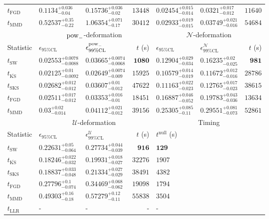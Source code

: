 \begin{tabular}{l|llr|llr}
	$t_{\mathrm{FGD}}$ & ${\mathbf{0.1134_{-0.04}^{+0.036}}}$ & ${\mathbf{0.15736_{-0.02}^{+0.036}}}$ & $13448$ & $0.02454_{-0.014}^{+0.015}$ & $0.0321_{-0.012}^{+0.017}$ & $11640$ \\
	$t_{\mathrm{MMD}}$ & $0.52537_{-0.22}^{+0.35}$ & $1.06354_{-0.17}^{+0.071}$ & $30412$ & $0.02933_{-0.015}^{+0.019}$ & $0.03749_{-0.016}^{+0.021}$ & $54684$ \\
	\toprule
	\multicolumn{1}{c}{} & \multicolumn{3}{c}{$\rm{pow}_{-}$-deformation} & \multicolumn{3}{c}{$\mathcal{N}$-deformation} \\
	Statistic & $\epsilon_{95\%\mathrm{CL}}$ & $\epsilon^  {\rm{pow}_{-}}_{99\%\mathrm{CL}}$ & $t$ (s) & $\epsilon_{95\%\mathrm{CL}}$ & $\epsilon^    {\mathcal{N}}_{99\%\mathrm{CL}}$ & $t$ (s) \\
	\midrule
	$t_{\mathrm{SW}}$ & $0.02553_{-0.0088}^{+0.0078}$ & $0.03665_{-0.0068}^{+0.0074}$ & ${\mathbf{1080}}$ & $0.12904_{-0.034}^{+0.029}$ & $0.16235_{-0.025}^{+0.02}$ & ${\mathbf{981}}$ \\
	$t_{\overline{\mathrm{KS}}}$ & ${\mathbf{0.02125_{-0.0092}^{+0.01}}}$ & ${\mathbf{0.02649_{-0.009}^{+0.0074}}}$ & $15925$ & ${\mathbf{0.10579_{-0.019}^{+0.014}}}$ & ${\mathbf{0.11672_{-0.016}^{+0.012}}}$ & $28786$ \\
	$t_{\mathrm{SKS}}$ & $0.02682_{-0.012}^{+0.012}$ & $0.03607_{-0.012}^{+0.01}$ & $47622$ & $0.11163_{-0.023}^{+0.022}$ & $0.12765_{-0.023}^{+0.017}$ & $38615$ \\
	$t_{\mathrm{FGD}}$ & $0.02511_{-0.012}^{+0.017}$ & $0.03353_{-0.01}^{+0.016}$ & $18451$ & $0.16887_{-0.052}^{+0.046}$ & $0.19783_{-0.036}^{+0.043}$ & $13634$ \\
	$t_{\mathrm{MMD}}$ & $0.03_{-0.014}^{+0.02}$ & $0.04112_{-0.012}^{+0.021}$ & $39156$ & $0.25305_{-0.11}^{+0.085}$ & $0.29551_{-0.073}^{+0.081}$ & $52861$ \\
	\toprule
	\multicolumn{1}{c}{} & \multicolumn{3}{c}{$\mathcal{U}$-deformation} & \multicolumn{3}{c}{Timing} \\
	Statistic & $\epsilon_{95\%\mathrm{CL}}$ & $\epsilon^    {\mathcal{U}}_{99\%\mathrm{CL}}$ & $t$ (s) & $t^{\mathrm{null}}$ (s) \\
	\midrule
	$t_{\mathrm{SW}}$ & $0.22631_{-0.064}^{+0.05}$ & $0.27734_{-0.039}^{+0.044}$ & ${\mathbf{916}}$ & ${\mathbf{129}}$ \\
	$t_{\overline{\mathrm{KS}}}$ & ${\mathbf{0.18246_{-0.032}^{+0.022}}}$ & ${\mathbf{0.19931_{-0.027}^{+0.018}}}$ & $32276$ & $1907$ \\
	$t_{\mathrm{SKS}}$ & $0.18837_{-0.048}^{+0.033}$ & $0.21334_{-0.029}^{+0.027}$ & $38491$ & $4382$ \\
	$t_{\mathrm{FGD}}$ & $0.27796_{-0.074}^{+0.1}$ & $0.34469_{-0.062}^{+0.068}$ & $19098$ & $1794$ \\
	$t_{\mathrm{MMD}}$ & $0.49303_{-0.18}^{+0.16}$ & $0.57279_{-0.11}^{+0.12}$ & $55838$ & $3504$ \\
	$t_{\mathrm{LLR}}$ & - & - & - & - \\
	\bottomrule
\end{tabular}